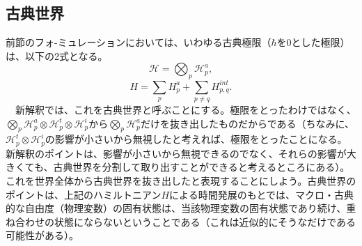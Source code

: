 \subsection{古典世界}
前節のフォ-ミュレーションにおいては、いわゆる古典極限（$\hbar$を$0$とした極限）は、以下の2式となる。
\begin{equation}
    \mathcal{H} = \bigotimes_p \mathcal{H}_p^a,
\end{equation}
\begin{equation}
H=\sum_pH_p^a+ \sum_{p \neq q} H^{int}_{p,q}.
\end{equation}
　新解釈では、これを古典世界と呼ぶことにする。極限をとったわけではなく、$\bigotimes_p \mathcal{H}_p^a \otimes  \mathcal{H}_p^t \otimes  \mathcal{H}_p^i$から$\bigotimes_p \mathcal{H}_p^a$だけを抜き出したものだからである（ちなみに、$\mathcal{H}_p^t \otimes  \mathcal{H}_p^i$の影響が小さいから無視したと考えれば、極限をとったことになる。新解釈のポイントは、影響が小さいから無視できるのでなく、それらの影響が大きくても、古典世界を分割して取り出すことができると考えるところにある）。これを世界全体から古典世界を抜き出したと表現することにしよう。古典世界のポイントは、上記のハミルトニアン$H$による時間発展のもとでは、マクロ・古典的な自由度（物理変数）の固有状態は、当該物理変数の固有状態であり続け、重ね合わせの状態にならないということである（これは近似的にそうなだけである可能性がある）。